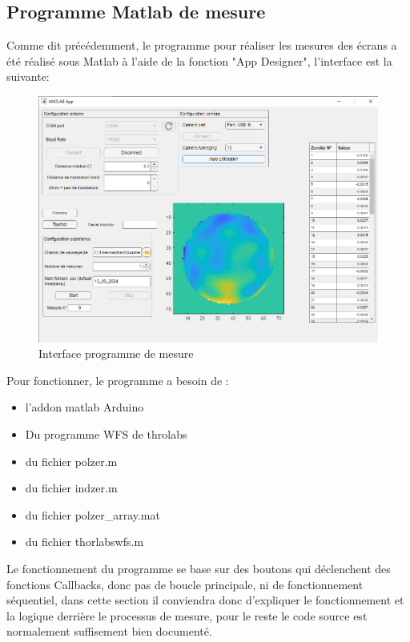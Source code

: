 \subsection{Programme Matlab de mesure}
Comme dit précédemment, le programme pour réaliser les mesures des écrans a été réalisé sous Matlab à l'aide de la fonction "App Designer", l'interface est la suivante:
\begin{figure}[H]
    \centering
    \includegraphics[width = \textwidth]{assets/figures/ameliorations/capture interface.png}
    \caption{Interface programme de mesure}
\end{figure}
Pour fonctionner, le programme a besoin de :
\begin{itemize}
    \item l'addon matlab Arduino
    \item Du programme WFS de throlabs \cite{WFS_thorlabs_site}
    \item du fichier polzer.m
    \item du fichier indzer.m
    \item du fichier polzer\_array.mat
    \item du fichier thorlabswfs.m
\end{itemize}

Le fonctionnement du programme se base sur des boutons qui déclenchent des fonctions Callbacks, donc pas de boucle principale,
ni de fonctionnement séquentiel, dans cette section il conviendra donc d'expliquer le fonctionnement et la logique derrière le processus
de mesure, pour le reste le code source est normalement suffisement bien documenté.
\newpage

